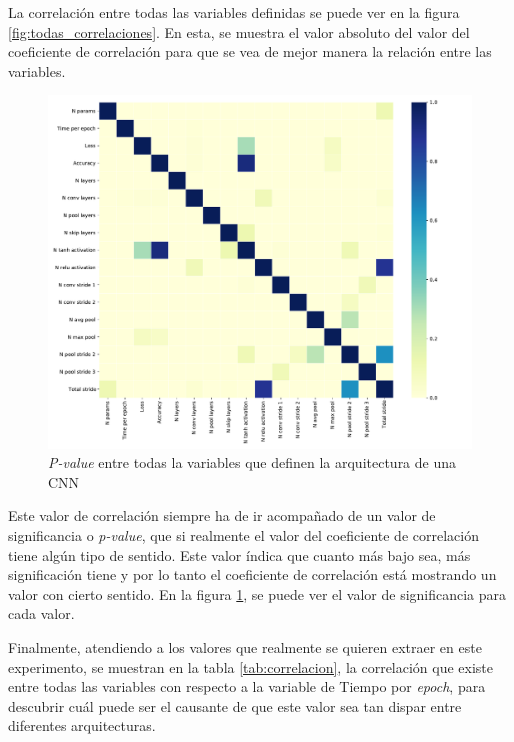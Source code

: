 \begin{itemize}
    La correlación entre todas las variables definidas se puede ver en la figura \ref{fig:todas_correlaciones}. En esta, se muestra el valor absoluto del valor del coeficiente de correlación para que se vea de mejor manera la relación entre las variables.
    
    \begin{figure}[h]
        \centering
        \includegraphics[width=\textwidth]{figuras/experimentos/correlacion/spearman_pvalues.pdf}
        \caption{\textit{P-value} entre todas la variables que definen la arquitectura de una CNN}
        \label{fig:p-value}
    \end{figure}
    
    Este valor de correlación siempre ha de ir acompañado de un valor de significancia o \textit{p-value}, que si realmente el valor del coeficiente de correlación tiene algún tipo de sentido. Este valor índica que cuanto más bajo sea, más significación tiene y por lo tanto el coeficiente de correlación está mostrando un valor con cierto sentido. En la figura \ref{fig:p-value}, se puede ver el valor de significancia para cada valor.
    
    Finalmente, atendiendo a los valores que realmente se quieren extraer en este experimento, se muestran en la tabla \ref{tab:correlacion}, la correlación que existe entre todas las variables con respecto a la variable de Tiempo por \textit{epoch}, para descubrir cuál puede ser el causante de que este valor sea tan dispar entre diferentes arquitecturas.
    

\end{itemize}
